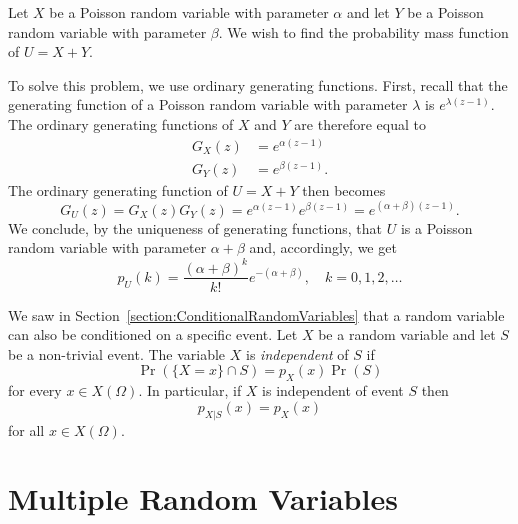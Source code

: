 \begin{example}
Let $X$ be a Poisson random variable with parameter $\alpha$ and let $Y$ be a Poisson random variable with parameter $\beta$.
We wish to find the probability mass function of $U = X + Y$.

To solve this problem, we use ordinary generating functions.
First, recall that the generating function of a Poisson random variable with parameter $\lambda$ is $e^{\lambda (z-1)}$.
The ordinary generating functions of $X$ and $Y$ are therefore equal to
\begin{align*}
G_X (z) &= e^{\alpha (z-1)} \\
G_Y (z) &= e^{\beta (z-1)} .
\end{align*}
The ordinary generating function of $U = X + Y$ then becomes
\begin{equation*}
G_U (z) = G_X (z) G_Y(z) = e^{\alpha (z-1)} e^{\beta (z-1)}
= e^{(\alpha + \beta) (z-1)} .
\end{equation*}
We conclude, by the uniqueness of generating functions, that $U$ is a Poisson random variable with parameter $\alpha + \beta$ and, accordingly, we get
\begin{equation*}
p_U (k) = \frac{ (\alpha + \beta)^k }{k!} e^{- (\alpha + \beta) },
\quad k = 0, 1, 2, \ldots
\end{equation*}
\end{example}

We saw in Section~\ref{section:ConditionalRandomVariables} that a random variable can also be conditioned on a specific event.
Let $X$ be a random variable and let $S$ be a non-trivial event.
The variable $X$ is \emph{independent} of $S$ if
\begin{equation*}
\Pr (\{X = x \} \cap S ) = p_X (x) \Pr (S)
\end{equation*}
for every $x \in X(\Omega)$.
In particular, if $X$ is independent of event $S$ then
\begin{equation*}
p_{X|S} (x) = p_X (x)
\end{equation*}
for all $x \in X(\Omega)$.


\section{Multiple Random Variables}


